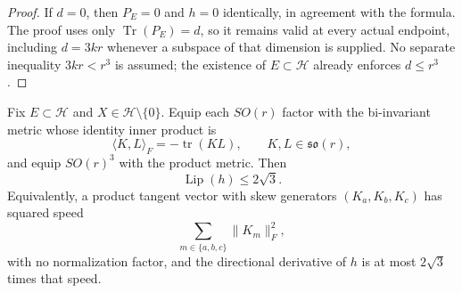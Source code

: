 \begin{proof}
If \(d=0\), then \(P_E=0\) and \(h=0\) identically, in agreement with the
formula. The proof uses only \(\operatorname{Tr}(P_E)=d\), so it remains
valid at every actual endpoint, including \(d=3kr\) whenever a subspace of
that dimension is supplied. No separate inequality \(3kr<r^3\) is assumed;
the existence of \(E\subset\mathcal H\) already enforces \(d\le r^3\).


\end{proof}


\begin{lemma}
\label{lem:step-007-lipschitz}
Fix \(E\subset\mathcal H\) and \(X\in\mathcal H\setminus\{0\}\). Equip each
\(SO(r)\) factor with the bi-invariant metric whose identity inner product is
\[
  \langle K,L\rangle_F=-\operatorname{tr}(KL),
  \qquad K,L\in\mathfrak{so}(r),
\]
and equip \(SO(r)^3\) with the product metric. Then
\begin{equation}
  \boxed{\operatorname{Lip}(h)\le2\sqrt3}.                  \label{eq:step-007-11}
\end{equation}
Equivalently, a product tangent vector with skew generators
\((K_a,K_b,K_c)\) has squared speed
\[
  \sum_{m\in\{a,b,c\}}\|K_m\|_F^2,
\]
with no normalization factor, and the directional derivative of \(h\) is at
most \(2\sqrt3\) times that speed.

\end{lemma}

